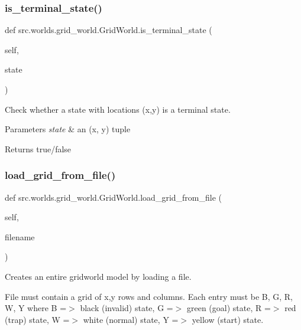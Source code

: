 \subsubsection{\texorpdfstring{is\+\_\+terminal\+\_\+state()}{is\_terminal\_state()}}
{\footnotesize\ttfamily def src.\+worlds.\+grid\+\_\+world.\+Grid\+World.\+is\+\_\+terminal\+\_\+state (\begin{DoxyParamCaption}\item[{}]{self,  }\item[{}]{state }\end{DoxyParamCaption})}



Check whether a state with locations (x,y) is a terminal state. 


\begin{DoxyParams}{Parameters}
{\em state} & an (x, y) tuple \\
\hline
\end{DoxyParams}
\begin{DoxyReturn}{Returns}
true/false 
\end{DoxyReturn}
\mbox{\label{classsrc_1_1worlds_1_1grid__world_1_1_grid_world_a49dba2f7cbb6c4f5ccb05b6c1f7a0000}} 
\subsubsection{\texorpdfstring{load\+\_\+grid\+\_\+from\+\_\+file()}{load\_grid\_from\_file()}}
{\footnotesize\ttfamily def src.\+worlds.\+grid\+\_\+world.\+Grid\+World.\+load\+\_\+grid\+\_\+from\+\_\+file (\begin{DoxyParamCaption}\item[{}]{self,  }\item[{}]{filename }\end{DoxyParamCaption})}



Creates an entire gridworld model by loading a file. 

File must contain a grid of x,y rows and columns. Each entry must be \textquotesingle{}B\textquotesingle{}, \textquotesingle{}G\textquotesingle{}, \textquotesingle{}R\textquotesingle{}, \textquotesingle{}W\textquotesingle{}, \textquotesingle{}Y\textquotesingle{} where \textquotesingle{}B\textquotesingle{} =$>$ black (invalid) state, \textquotesingle{}G\textquotesingle{} =$>$ green (goal) state, \textquotesingle{}R\textquotesingle{} =$>$ red (trap) state, \textquotesingle{}W\textquotesingle{} =$>$ white (normal) state, \textquotesingle{}Y\textquotesingle{} =$>$ yellow (start) state.


